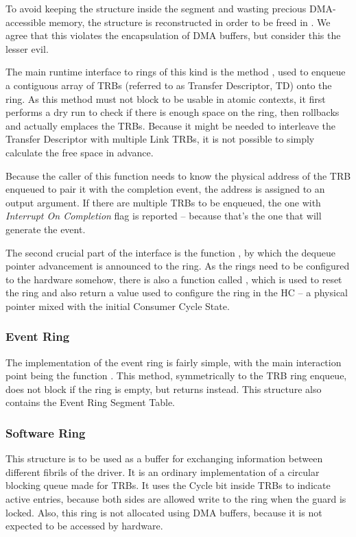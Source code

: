 To avoid keeping the  structure inside the segment and
wasting precious DMA-accessible memory, the structure is reconstructed in order
to be freed in . We agree that this violates the
encapsulation of DMA buffers, but consider this the lesser evil.

The main runtime interface to rings of this kind is the method
, used to enqueue a contiguous array of
TRBs (referred to as Transfer Descriptor, TD) onto the ring. As this method
must not block to be usable in atomic contexts, it first performs a dry run to
check if there is enough space on the ring, then rollbacks and actually
emplaces the TRBs. Because it might be needed to interleave the Transfer
Descriptor with multiple Link TRBs, it is not possible to simply calculate the
free space in advance.

Because the caller of this function needs to know the physical address of the
TRB enqueued to pair it with the completion event, the address is assigned to
an output argument. If there are multiple TRBs to be enqueued, the one with
\emph{Interrupt On Completion} flag is reported -- because that's the one that
will generate the event.

The second crucial part of the interface is the function
, by which the dequeue pointer advancement is
announced to the ring. As the rings need to be configured to the hardware
somehow, there is also a function called
, which is used to reset the ring and
also return a value used to configure the ring in the HC -- a physical pointer
mixed with the initial Consumer Cycle State.

\subsubsection{Event Ring}

The implementation of the event ring is fairly simple, with the main
interaction point being the function . This
method, symmetrically to the TRB ring enqueue, does not block if the ring is
empty, but returns  instead. This structure also contains the
Event Ring Segment Table.

\subsubsection{Software Ring}
\label{sec:sw-rings}

This structure is to be used as a buffer for exchanging information between
different fibrils of the driver. It is an ordinary implementation of a circular
blocking queue made for TRBs. It uses the Cycle bit inside TRBs to indicate
active entries, because both sides are allowed write to the ring when the guard
is locked. Also, this ring is not allocated using DMA buffers, because it is
not expected to be accessed by hardware.
